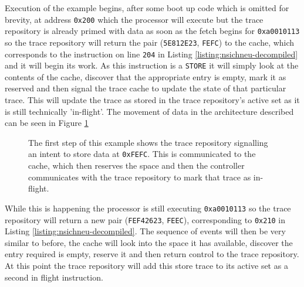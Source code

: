 {
	\renewcommand*\thelstnumber{\ifnum\value{lstnumber}<8 0\fi \xintDecToHex{\the\value{lstnumber}*4}}
	\makeatletter
	\let\orig@lstnumber=\thelstnumber
	
	\newcommand\lstsetnumber[1]{\gdef\thelstnumber{#1}}
	\newcommand\lstresetnumber{\global\let\thelstnumber=\orig@lstnumber}
	\makeatother
	
}

Execution of the example begins, after some boot up code which is omitted for brevity, at address \texttt{0x200} which the processor will execute but the trace repository is already primed with data as soon as the fetch begins for \texttt{0xa0010113} so the trace repository will return the pair (\texttt{5E812E23}, \texttt{FEFC}) to the cache, which corresponds to the instruction on line \texttt{204} in Listing \ref{listing:nsichneu-decompiled} and it will begin its work. As this instruction is a \texttt{STORE} it will simply look at the contents of the cache, discover that the appropriate entry is empty, mark it as reserved and then signal the trace cache to update the state of that particular trace. This will update the trace as stored in the trace repository's active set as it is still technically 'in-flight'. The movement of data in the architecture described can be seen in Figure \ref{fig:trace-assisted-cache-example-step-1}

\begin{figure}[htbp]
	
	\caption{The first step of this example shows the trace repository signalling an intent to store data at \texttt{0xFEFC}. This is communicated to the cache, which then reserves the space and then the controller communicates with the trace repository to mark that trace as in-flight.}
	\label{fig:trace-assisted-cache-example-step-1}
\end{figure}

While this is happening the processor is still executing \texttt{0xa0010113} so the trace repository will return a new pair (\texttt{FEF42623}, \texttt{FEEC}), corresponding to \texttt{0x210} in Listing  \ref{listing:nsichneu-decompiled}. The sequence of events will then be very similar to before, the cache will look into the space it has available, discover the entry required is empty, reserve it and then return control to the trace repository. At this point the trace repository will add this store trace to its active set as a second in flight instruction.

